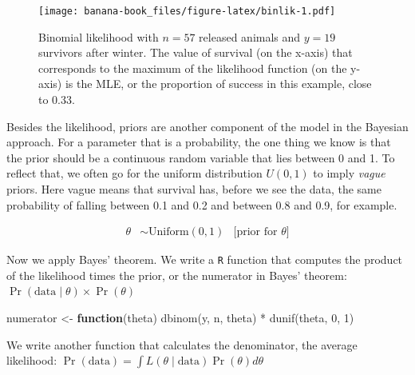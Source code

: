 \documentclass[
  12pt,
]{krantz}
\newenvironment{Shaded}{\begin{snugshade}}{\end{snugshade}}
\newcommand{\ControlFlowTok}[1]{\textcolor[rgb]{0.13,0.29,0.53}{\textbf{#1}}}
\newcommand{\DecValTok}[1]{\textcolor[rgb]{0.00,0.00,0.81}{#1}}
\newcommand{\FunctionTok}[1]{\textcolor[rgb]{0.00,0.00,0.00}{#1}}
\newcommand{\NormalTok}[1]{#1}
\newcommand{\OtherTok}[1]{\textcolor[rgb]{0.56,0.35,0.01}{#1}}
\newcommand{\SpecialCharTok}[1]{\textcolor[rgb]{0.00,0.00,0.00}{#1}}
\begin{document}
\begin{figure}
\centering
\texttt{[image: banana-book\_files/figure-latex/binlik-1.pdf]}
\caption{\label{fig:binlik}Binomial likelihood with \(n = 57\) released animals and \(y = 19\) survivors after winter. The value of survival (on the x-axis) that corresponds to the maximum of the likelihood function (on the y-axis) is the MLE, or the proportion of success in this example, close to 0.33.}
\end{figure}

Besides the likelihood, priors are another component of the model in the Bayesian approach. For a parameter that is a probability, the one thing we know is that the prior should be a continuous random variable that lies between 0 and 1. To reflect that, we often go for the uniform distribution \(U(0,1)\) to imply \emph{vague} priors. Here vague means that survival has, before we see the data, the same probability of falling between 0.1 and 0.2 and between 0.8 and 0.9, for example.

\begin{align*}
\theta &\sim \text{Uniform}(0, 1) &\text{[prior for }\theta \text{]}
\end{align*}

Now we apply Bayes' theorem. We write a \texttt{R} function that computes the product of the likelihood times the prior, or the numerator in Bayes' theorem: \(\Pr(\text{data} \mid \theta) \times \Pr(\theta)\)

\begin{Shaded}
\begin{Highlighting}[]
\NormalTok{numerator }\OtherTok{\textless{}{-}} \ControlFlowTok{function}\NormalTok{(theta) }\FunctionTok{dbinom}\NormalTok{(y, n, theta) }\SpecialCharTok{*} \FunctionTok{dunif}\NormalTok{(theta, }\DecValTok{0}\NormalTok{, }\DecValTok{1}\NormalTok{)}
\end{Highlighting}
\end{Shaded}

We write another function that calculates the denominator, the average likelihood: \(\Pr(\text{data}) = \int{L(\theta \mid \text{data}) \Pr(\theta) d\theta}\)

\begin{Shaded}
\end{Shaded}
\end{document}
